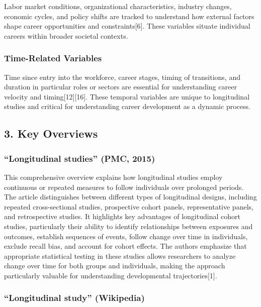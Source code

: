 \documentclass[
  letterpaper,
  DIV=11,
  numbers=noendperiod]{scrartcl}
\begin{document}
Labor market conditions, organizational characteristics, industry
changes, economic cycles, and policy shifts are tracked to understand
how external factors shape career opportunities and constraints{[}6{]}.
These variables situate individual careers within broader societal
contexts.

\subsubsection{Time-Related Variables}\label{time-related-variables}

Time since entry into the workforce, career stages, timing of
transitions, and duration in particular roles or sectors are essential
for understanding career velocity and timing{[}12{]}{[}16{]}. These
temporal variables are unique to longitudinal studies and critical for
understanding career development as a dynamic process.

\subsection{3. Key Overviews}\label{key-overviews}

\subsubsection{``Longitudinal studies'' (PMC,
2015)}\label{longitudinal-studies-pmc-2015}

This comprehensive overview explains how longitudinal studies employ
continuous or repeated measures to follow individuals over prolonged
periods. The article distinguishes between different types of
longitudinal designs, including repeated cross-sectional studies,
prospective cohort panels, representative panels, and retrospective
studies. It highlights key advantages of longitudinal cohort studies,
particularly their ability to identify relationships between exposures
and outcomes, establish sequences of events, follow change over time in
individuals, exclude recall bias, and account for cohort effects. The
authors emphasize that appropriate statistical testing in these studies
allows researchers to analyze change over time for both groups and
individuals, making the approach particularly valuable for understanding
developmental trajectories{[}1{]}.

\subsubsection{``Longitudinal study''
(Wikipedia)}\label{longitudinal-study-wikipedia}
\end{document}
